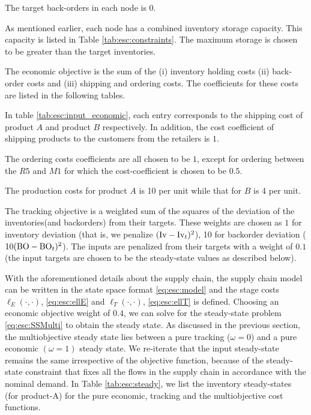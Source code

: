 The target back-orders in each node is $0$.

As mentioned earlier, each node has a combined inventory storage
capacity. This capacity is listed in Table \ref{tab:esc:constraints}. The
maximum storage is chosen to be greater than the target inventories.


The economic objective is the sum of the (i) inventory holding costs
(ii) back-order costs and (iii) shipping and ordering costs. The
coefficients for these costs are listed in the following tables.

In table \ref{tab:esc:input_economic}, each entry corresponds to the
shipping cost of product $A$ and product $B$ respectively. In
addition, the cost coefficient of shipping products to the
customers from the retailers is $1$.

The ordering costs coefficients are all chosen to be $1$, except for
ordering between the $R5$ and $M1$ for which the cost-coefficient is
chosen to be $0.5$. 

The production costs for product $A$ is 10 per unit while that for $B$
is 4 per unit.


The tracking objective is a weighted sum of the squares of the
deviation of the inventories(and backorders) from their targets. These
weights are chosen as $1$ for inventory deviation (that is, we
penalize $(\textrm{Iv}-\textrm{Iv}_t)^2$), 10 for backorder deviation
($10(\textrm{BO}-\textrm{BO}_t)^2$). The inputs are penalized from their targets with
a weight of $0.1$ (the input targets are chosen to be the steady-state
values as described below).


With the aforementioned details about the supply chain, the supply
chain model can be written in the state space format \eqref{eq:esc:model} and the stage
costs $\ell_E(\cdot,\cdot)$, \eqref{eq:esc:ellE} and
$\ell_T(\cdot,\cdot)$, \eqref{eq:esc:ellT} is defined.  Choosing an
economic objective weight of $0.4$, we can solve for the steady-state
problem \eqref{eq:esc:SSMulti} to obtain the steady state. As discussed in
the previous section, the multiobjective steady state lies between a
pure tracking ($\omega = 0$) and a pure economic $(\omega=1)$ steady
state. We re-iterate that the input steady-state remains the same
irrespective of the objective function, because of the steady-state
constraint that fixes all the flows in the supply chain in accordance
with the nominal demand. In Table \ref{tab:esc:steady}, we list the
inventory steady-states (for product-A) for the pure economic, tracking and the
multiobjective cost functions.


